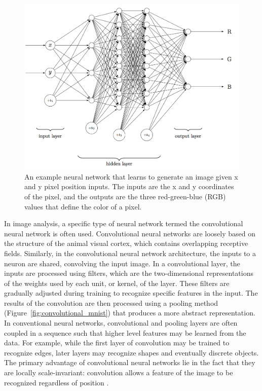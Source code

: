 \documentclass[12pt,oneside,onecolumn,a4paper]{article}
\begin{document}
\begin{figure}[H]
\begin{center}
\includegraphics[width=0.8\columnwidth]{figures/doodle}
\caption{An example neural network that learns to generate an image given x and y pixel position inputs. The inputs are the x and y coordinates of the pixel, and the outputs are the three red-green-blue (RGB) values that define the color of a pixel.
\label{fig:doodle}
}
\end{center}
\end{figure}

In image analysis, a specific type of neural network termed the convolutional neural network is often used. Convolutional neural networks are loosely based on the structure of the animal visual cortex, which contains overlapping receptive fields. Similarly, in the convolutional neural network architecture, the inputs to a neuron are shared, convolving the input image. In a convolutional layer, the inputs are processed using filters, which are the two-dimensional representations of the weights used by each unit, or kernel, of the layer. These filters are gradually adjusted during training to recognize specific features in the input. The results of the convolution are then processed using a pooling method (Figure~\ref{fig:convolutional_mnist}) that produces a more abstract representation. In conventional neural networks, convolutional and pooling layers are often coupled in a sequence such that higher level features may be learned from the data. For example, while the first layer of convolution may be trained to recognize edges, later layers may recognize shapes and eventually discrete objects. The primary advantage of convolutional neural networks lie in the fact that they are locally scale-invariant: convolution allows a feature of the image to be recognized regardless of position \citep{Krizhevsky2012ImageNetCW}.
\end{document}
